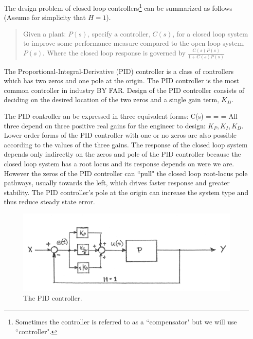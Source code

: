 The design problem of closed loop controllers\footnote{Sometimes the controller is referred to as a ``compensator" but we will use ``controller".} can be summarized as follows (Assume 
for simplicity that $H=1$).  

\begin{quotation}   Given a plant: $P(s)$,  specify a controller, $C(s)$, for a closed loop system to improve some performance measure compared to the open loop system, $P(s)$.
Where the closed loop response is governed by   $\frac{C(s)P(s)}{1 + C(s)P(s)}$ 
\end{quotation}



The Proportional-Integral-Derivative (PID) controller is a class of controllers which has
two zeros and one pole at the origin.  The PID controller is the most common controller in industry BY FAR.   Design of the PID controller consists of deciding on the desired 
location of the two zeros and a single gain term, $K_D$.   

The PID controller an be expressed in three equivalent forms:
\bq
C(s) =  =  =
\eq
All three depend on three positive real gains for the engineer to design: $K_P, K_I, K_D$.
Lower order forms of the PID
controller with one or no zeros are also possible according to the values of the three gains.
The response of the closed loop system depends only indirectly on the zeros and pole of the 
PID controller because the  closed loop system has a root locus and its response depends on 
were we are.   However the zeros of the PID controller can ``pull" the closed loop root-locus 
pole pathways, usually towards the left, which drives faster response and greater stability. 
The PID controller's pole at the origin can increase the system type and thus reduce 
steady state error. 

 
\begin{figure}\centering
\includegraphics[width=5.0in]{figs11/00651a.png}
\caption{The PID controller.}\label{PIDBlockDiagram}
\end{figure} 


